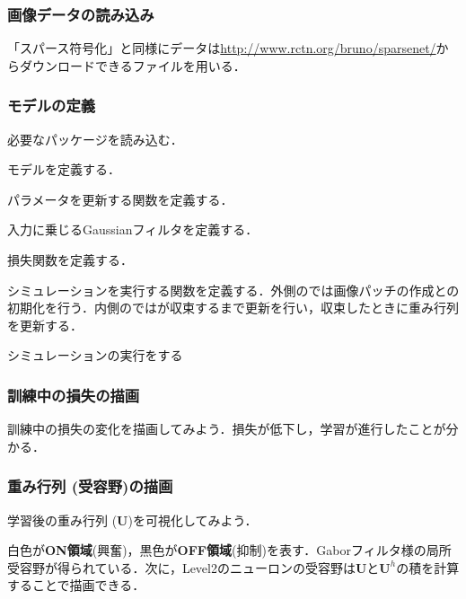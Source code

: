 \subsubsection{画像データの読み込み}
「スパース符号化」と同様にデータは\url{http://www.rctn.org/bruno/sparsenet/}からダウンロードできるファイルを用いる．

\subsubsection{モデルの定義}
必要なパッケージを読み込む．

モデルを定義する．

パラメータを更新する関数を定義する．

入力に乗じるGaussianフィルタを定義する．



損失関数を定義する．

シミュレーションを実行する関数を定義する．外側のでは画像パッチの作成との初期化を行う．内側のではが収束するまで更新を行い，収束したときに重み行列を更新する．

シミュレーションの実行をする

\subsubsection{訓練中の損失の描画}
訓練中の損失の変化を描画してみよう．損失が低下し，学習が進行したことが分かる．


\subsubsection{重み行列 (受容野)の描画}
学習後の重み行列 ($\mathbf{U}$)を可視化してみよう．


白色が\textbf{ON領域}(興奮)，黒色が\textbf{OFF領域}(抑制)を表す．Gaborフィルタ様の局所受容野が得られている．次に，Level2のニューロンの受容野は$\mathbf{U}$と$\mathbf{U}^h$の積を計算することで描画できる．


